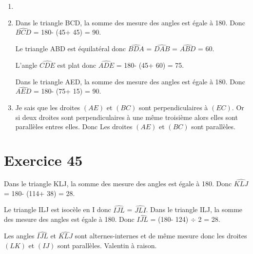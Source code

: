 \documentclass[12pt,a4paper]{article}
\begin{document}
\begin{enumerate}[label=\alph*.]
	\item \  
	
	\item Dans le triangle BCD, la somme des mesure des angles est égale à 180\degree . 	
	Donc $\widehat{BCD}$ = 180\degree - (45\degree  + 45\degree ) = 90\degree .
	
	Le triangle ABD est équilatéral donc $\widehat{BDA}$ = $\widehat{DAB}$ = $\widehat{ABD}$ = 60\degree .
	
	
	L'angle $\widehat{CDE}$ est plat donc $\widehat{ADE}$ = 180\degree  - (45\degree  + 60\degree ) = 75\degree .
	
	Dans le triangle AED, la somme des mesure des angles est égale à 180\degree . 	
	Donc $\widehat{AED}$ = 180\degree - (75\degree  + 15\degree ) = 90\degree .
	
	\item Je sais que les droites $(AE)$ et $(BC)$ sont perpendiculaires à $(EC)$.
	Or si deux droites sont perpendiculaires à une même troisième alors elles sont parallèles entres elles.
	Donc Les droites $(AE)$ et $(BC)$ sont parallèles.
	
\end{enumerate}


\section*{Exercice 45}

	Dans le triangle KLJ, la somme des mesure des angles est égale à 180\degree . 	
	Donc $\widehat{KLJ}$ = 180\degree - (114\degree  + 38\degree ) = 28\degree .
	
	
	Le triangle ILJ est isocèle en I donc $\widehat{IJL}$ = $\widehat{JLI}$. 
	Dans le triangle ILJ, la somme des mesure des angles est égale à 180\degree . 	
	Donc $\widehat{IJL}$ = (180\degree - 124\degree ) $\div$ 2 = 28\degree .
	
	
	
	Les angles $\widehat{IJL}$ et $\widehat{KLJ}$ sont alternes-internes et de même mesure donc les droites $(LK)$ et $(IJ)$ sont parallèles. Valentin à raison.
\end{document}
